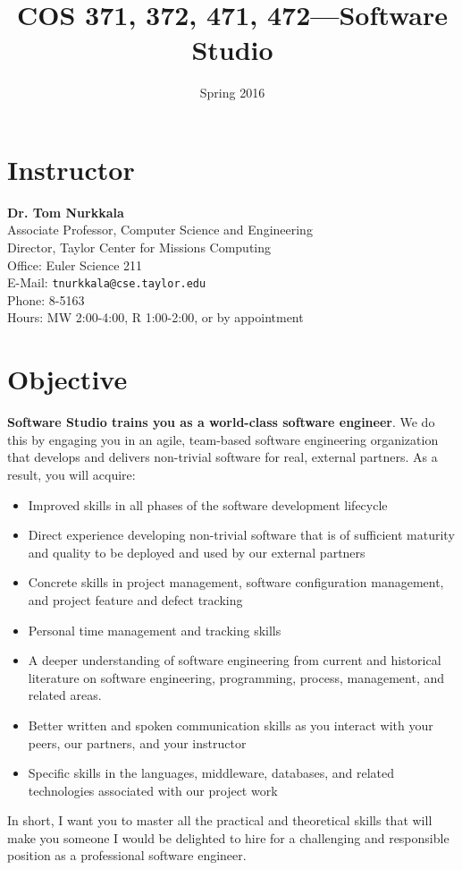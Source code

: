 \documentclass{article}
\date{Spring 2016}
\title{COS 371, 372, 471, 472---Software Studio}
\renewcommand\maketitle\relax
\begin{document}
\maketitle

\section{Instructor}
\label{sec:orgheadline1}
\textbf{Dr. Tom Nurkkala}\\
Associate Professor, Computer Science and Engineering\\
Director, Taylor Center for Missions Computing\\
Office: Euler Science 211\\
E-Mail: \texttt{tnurkkala@cse.taylor.edu}\\
Phone: 8-5163\\
Hours: MW 2:00-4:00, R 1:00-2:00, or by appointment
\section{Objective}
\label{sec:orgheadline2}
\textbf{Software Studio trains you as a world-class software engineer}.
We do this by engaging you in an agile, team-based software engineering organization
that develops and delivers non-trivial software for real, external partners.
As a result, you will acquire:
\begin{itemize}
\item Improved skills in all phases of the software development lifecycle
\item Direct experience developing non-trivial software that is of sufficient maturity and
quality to be deployed and used by our external partners
\item Concrete skills in project management, software configuration management, and project
feature and defect tracking
\item Personal time management and tracking skills
\item A deeper understanding of software engineering from current and historical literature on
software engineering, programming, process, management, and related areas.
\item Better written and spoken communication skills as you interact with your peers, our
partners, and your instructor
\item Specific skills in the languages, middleware, databases, and related technologies
associated with our project work
\end{itemize}
In short, I want you to master all the practical and theoretical skills
that will make you someone I would be delighted to hire
for a challenging and responsible position as a professional software engineer.
\end{document}
